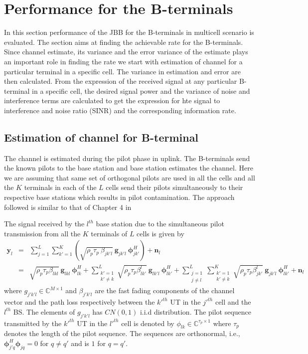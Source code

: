 \documentclass[10pt, a4paper, twoside,fleqn]{article}
\begin{document}
\section{Performance for the B-terminals}
	In this section performance of the JBB for the B-terminals in multicell scenario is evaluated. The section aims at finding the achievable rate for the B-terminals. Since channel estimate, its variance and the error variance of the estimate plays an important role in finding the rate we start with estimation of channel for a particular terminal in a specific cell. The variance in estimation and error are then calculated. From the expression of the received signal at any particular B-terminal in a specific cell, the desired signal power and the variance of noise and interference terms are calculated to get the expression for hte signal to interference and noise ratio (SINR) and the corresponding information rate.

\subsection{Estimation of channel for B-terminal} \label{sec:btchesti}
	The channel is estimated during the pilot phase in uplink. The B-terminals send the known pilots to the base station and base station estimates the channel. Here we are assuming that same set of orthogonal pilots are used in all the cells and all the $K$ terminals in each of the $L$ cells send their pilots simultaneously to their respective base stations which results in pilot contamination. The approach followed is similar to that of Chapter 4 in \cite{bib:MassiveMimoBook}

The signal received by the $l^{th}$ base station due to the simultaneous pilot transmission from  all the $K$ terminals of $L$ cells is given by
\begin{eqnarray}\label{eq:rcvy}
	\pmb{y}_{l} &=& \sum_{j=1}^{L} \sum_{k'=1}^{K} (\sqrt{\rho_p \tau_p \ \beta_{jk'l}} \ \pmb{g}_{jk'l} \ \pmb{\phi}^H_{jk'})
        		    +  \pmb{n}_{l} \nonumber \\                    
    			   &=& \sqrt{\rho_p \tau_p \beta_{lkl}} \ \pmb{g}_{lkl} \ \pmb{\phi}^H_{lk}
        			+  \sum_{\substack{k'=1 \\ k' \neq k}}^{L} \sqrt{\rho_p \tau_p \beta_{lk'}^{l}} \ \pmb{g}_{lk'l} \ \pmb{\phi}^H_{lk'}
        		    +  \sum_{\substack{j=1 \\ j \neq l}}^{L} \sum_{\substack{k'=1 \\ k' \neq k}}^{K} \sqrt{\rho_p \tau_p \beta_{jk'}^{l}} \
                       \pmb{g}_{jk'l} \ \pmb{\phi}^H_{lk'}
    			    +  \pmb{n}_{l}
\end{eqnarray}
where $g_{j'k'l} \in {\mathbb C}^{M \times 1}$  and $\beta_{j'k'l}$ are the fast fading components of the channel vector and the path loss respectively between the $k'^{th}$ UT in the $j'^{th}$ cell and the $l^{th}$ BS. The elements of $g_{j'k'l}$ has $CN(0,1)$ i.i.d distribution. The pilot sequence transmitted by the $k'^{th}$ UT in the $l'^{th}$ cell is denoted by $\phi_{lk} \in {\mathbb C}^{\tau_p \times 1}$ where $\tau_p$ denotes the length of the pilot sequence. The sequences are orthonormal, i.e., $\pmb{\phi}_{j'q}^H \pmb{\phi}_{jq} = 0$ for  $q \ne q'$ and is $1$ for $q=q'$.
\end{document}
